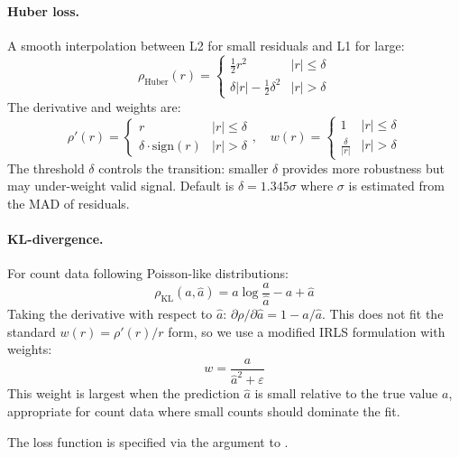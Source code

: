 \documentclass[article]{jss_modified}
\newcommand{\fct}[1]{\code{#1()}}
\begin{document}
\paragraph{Huber loss.}
A smooth interpolation between L2 for small residuals and L1 for large:
\begin{equation}
  \rho_{\text{Huber}}(r) = \begin{cases}
    \frac{1}{2}r^2 & |r| \leq \delta \\
    \delta|r| - \frac{1}{2}\delta^2 & |r| > \delta
  \end{cases}
  \label{eq:huber}
\end{equation}
The derivative and weights are:
\begin{equation}
  \rho'(r) = \begin{cases}
    r & |r| \leq \delta \\
    \delta \cdot \text{sign}(r) & |r| > \delta
  \end{cases}, \quad
  w(r) = \begin{cases}
    1 & |r| \leq \delta \\
    \frac{\delta}{|r|} & |r| > \delta
  \end{cases}
  \label{eq:huber_weights}
\end{equation}
The threshold $\delta$ controls the transition: smaller $\delta$ provides more 
robustness but may under-weight valid signal. Default is $\delta = 1.345\sigma$ 
where $\sigma$ is estimated from the MAD of residuals.

\paragraph{KL-divergence.}
For count data following Poisson-like distributions:
\begin{equation}
  \rho_{\text{KL}}(a, \hat{a}) = a \log\frac{a}{\hat{a}} - a + \hat{a}
  \label{eq:kl}
\end{equation}
Taking the derivative with respect to $\hat{a}$: $\partial\rho/\partial\hat{a} 
= 1 - a/\hat{a}$. This does not fit the standard $w(r) = \rho'(r)/r$ form, so 
we use a modified IRLS formulation with weights:
\begin{equation}
  w = \frac{a}{\hat{a}^2 + \varepsilon}
\end{equation}
This weight is largest when the prediction $\hat{a}$ is small relative to the 
true value $a$, appropriate for count data where small counts should dominate 
the fit.

The loss function is specified via the  argument to \fct{nmf}.
\end{document}
